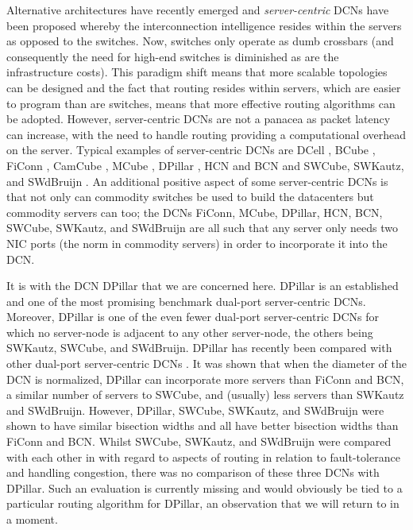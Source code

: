 \documentclass{article}
\begin{document}
Alternative architectures have recently emerged and  \emph{server-centric\/} DCNs have been proposed whereby the interconnection intelligence resides within the servers as opposed to the switches. Now, switches only operate as dumb crossbars (and consequently the need for high-end switches is diminished as are the infrastructure costs). This paradigm shift means that more scalable topologies can be designed and the fact that routing resides within servers, which are easier to program than are switches, means that more effective routing algorithms can be adopted. However, server-centric DCNs are not a panacea as packet latency can increase, with the need to handle routing providing a computational overhead on the server. Typical examples of server-centric DCNs are DCell \cite{GWT08}, BCube \cite{GLL09}, FiConn \cite{LGW09}, CamCube \cite{ACR10}, MCube \cite{WWY10}, DPillar \cite{LYY12}, HCN and BCN \cite{GCL13} and SWCube, SWKautz, and SWdBruijn \cite{LW15}. An additional positive aspect of some server-centric DCNs is that not only can commodity switches be used to build the datacenters but commodity servers can too; the DCNs FiConn, MCube, DPillar, HCN, BCN, SWCube, SWKautz, and SWdBruijn are all such that any server only needs two NIC ports (the norm in commodity servers) in order to incorporate it into the DCN.

It is with the DCN DPillar that we are concerned here. DPillar is an established
and one of the most promising benchmark dual-port server-centric DCNs. Moreover,
DPillar is one of the even fewer dual-port server-centric DCNs for which no
server-node is adjacent to any other server-node, the others being SWKautz,
SWCube, and SWdBruijn. DPillar has recently been compared with other dual-port
server-centric DCNs \cite{LW15}. It was shown that when the diameter of the DCN
is normalized, DPillar can incorporate more servers than FiConn and BCN, a
similar number of servers to SWCube, and (usually) less servers than SWKautz and
SWdBruijn. However, DPillar, SWCube, SWKautz, and SWdBruijn were shown to have
similar bisection widths and all have better bisection widths than FiConn and
BCN. Whilst SWCube, SWKautz, and SWdBruijn were compared with each other in
\cite{LW15} with regard to aspects of routing in relation to fault-tolerance and
handling congestion, there was no comparison of these three DCNs with DPillar.
Such an evaluation is currently missing and would obviously be tied to a
particular routing algorithm for DPillar, an observation that we will return to
in a moment.
\end{document}
